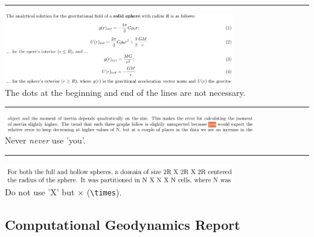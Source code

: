 \par\noindent\rule{\textwidth}{0.4pt}
\begin{center}
\includegraphics[width=10cm]{images/grading/dots}\\
The dots at the beginning and end of the lines are not necessary.
\end{center}

\par\noindent\rule{\textwidth}{0.4pt}
\begin{center}
\includegraphics[width=11cm]{images/grading/you}\\
Never {\it never} use 'you'. 
\end{center}

\par\noindent\rule{\textwidth}{0.4pt}
\begin{center}
\includegraphics[width=10cm]{images/grading/cross}\\
Do not use 'X' but $\times$ (\verb|\times|).
\end{center}




\subsection{Computational Geodynamics Report}

